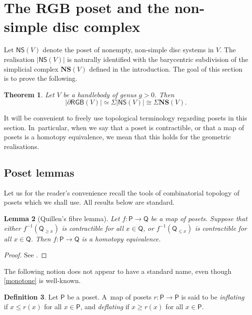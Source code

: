 \documentclass[JEP,XML,SOM,Unicode,NoFloatCountersInSection,published]{cedram}
\theoremstyle{plain}
\newtheorem{thm}{Theorem}[section]
\newtheorem{lem}[thm]{Lemma}
\theoremstyle{definition}
\newtheorem{defn}[thm]{Definition}
\newcommand{\dRGB}{\partial\mathsf{RGB}}
\newcommand{\NS}{\mathsf{NS}}
\newcommand{\compNS}{\mathbf{NS}}
\newcommand{\Po}{\mathsf{P}}
\begin{document}
\section{The RGB poset and the non-simple disc complex} \label{s:poset}

Let $\NS(V)$ denote the poset of nonempty, non-simple disc systems in $V$. The realisation $|\NS(V)|$ is naturally identified with the barycentric subdivision of the simplicial complex $\compNS(V)$ defined in the introduction. The goal of this section is to prove the following.
\begin{thm}\label{thm:simplifying}Let $V$ be a handlebody of genus $g>0$. Then
\[
|\dRGB(V)| \simeq \Sigma |\NS(V)| \cong \Sigma \compNS(V).
\]
\end{thm}

It will be convenient to freely use topological terminology regarding posets in this section. In~particular, when we say \eg that a poset is contractible, or that a map of posets is a homotopy equivalence, we mean that this holds for the geometric realisations.

\subsection{Poset lemmas}
Let us for the reader's convenience recall the tools of combinatorial topology of posets which we shall use. All results below are standard.

\begin{lem}[Quillen's fibre lemma] \label{lemma:fibre_lemma} Let $f:\mathsf P \to \mathsf Q$ be a map of posets. Suppose that either $f^{-1}(\mathsf Q_{\geq x})$ is contractible for all $x \in \mathsf Q$, or $f^{-1}(\mathsf Q_{\leq x})$ is contractible for all $x \in \mathsf Q$. Then $f \colon \mathsf P\to\mathsf Q $ is a homotopy equivalence. \end{lem}

\begin{proof}
See \cite[Prop.\,1.6]{quillen-homotopyproperties}.
\end{proof}

The following notion does not appear to have a standard name, even though \cref{monotone} is well-known.

\begin{defn}
Let $\Po$ be a poset. A~map of posets $r:\Po \to \Po$ is said to be \emph{inflating} if $x \leq r(x)$ for all $x \in \Po$, and \emph{deflating} if $x \geq r(x)$ for all $x \in \Po.$
\end{defn}
\end{document}
